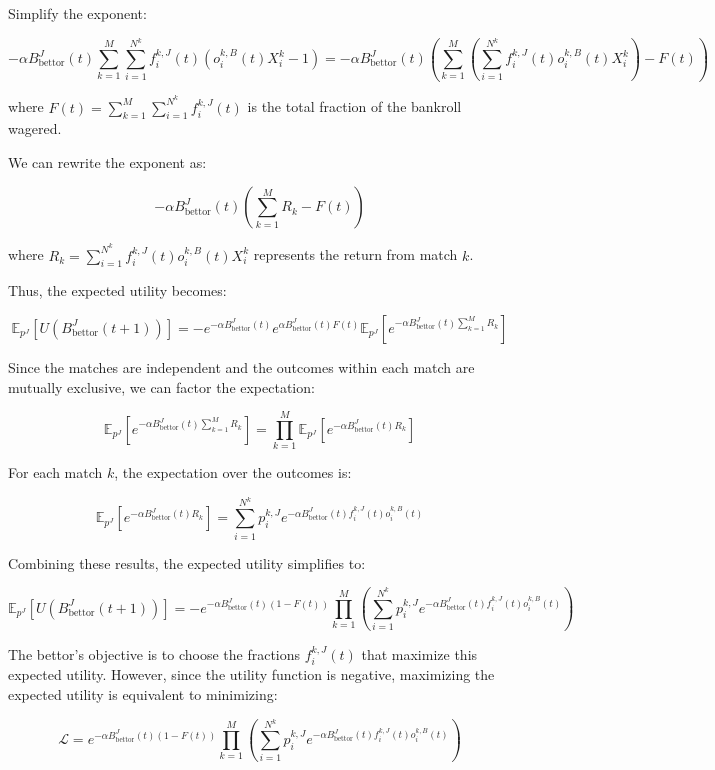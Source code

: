 Simplify the exponent:

\[
-\alpha B_{\text{bettor}}^J(t) \sum_{k=1}^M \sum_{i=1}^{N^k} f_i^{k,J}(t) \left( o_i^{k,B}(t) X_i^k - 1 \right) = -\alpha B_{\text{bettor}}^J(t) \left( \sum_{k=1}^M \left( \sum_{i=1}^{N^k} f_i^{k,J}(t) o_i^{k,B}(t) X_i^k \right) - F(t) \right)
\]

where \( F(t) = \sum_{k=1}^M \sum_{i=1}^{N^k} f_i^{k,J}(t) \) is the total fraction of the bankroll wagered.

We can rewrite the exponent as:

\[
-\alpha B_{\text{bettor}}^J(t) \left( \sum_{k=1}^M R_k - F(t) \right)
\]

where \( R_k = \sum_{i=1}^{N^k} f_i^{k,J}(t) o_i^{k,B}(t) X_i^k \) represents the return from match \( k \).

Thus, the expected utility becomes:

\[
\mathbb{E}_{p^{J}}\left[ U\left( B_{\text{bettor}}^J(t+1) \right) \right] = -e^{ -\alpha B_{\text{bettor}}^J(t) } e^{ \alpha B_{\text{bettor}}^J(t) F(t) } \mathbb{E}_{p^{J}}\left[ e^{ -\alpha B_{\text{bettor}}^J(t) \sum_{k=1}^M R_k } \right]
\]

Since the matches are independent and the outcomes within each match are mutually exclusive, we can factor the expectation:

\[
\mathbb{E}_{p^{J}}\left[ e^{ -\alpha B_{\text{bettor}}^J(t) \sum_{k=1}^M R_k } \right] = \prod_{k=1}^M \mathbb{E}_{p^{J}}\left[ e^{ -\alpha B_{\text{bettor}}^J(t) R_k } \right]
\]

For each match \( k \), the expectation over the outcomes is:

\[
\mathbb{E}_{p^{J}}\left[ e^{ -\alpha B_{\text{bettor}}^J(t) R_k } \right] = \sum_{i=1}^{N^k} p_i^{k,J} e^{ -\alpha B_{\text{bettor}}^J(t) f_i^{k,J}(t) o_i^{k,B}(t) }
\]

Combining these results, the expected utility simplifies to:

\[
\mathbb{E}_{p^{J}}\left[ U\left( B_{\text{bettor}}^J(t+1) \right) \right] = -e^{ -\alpha B_{\text{bettor}}^J(t) (1 - F(t)) } \prod_{k=1}^M \left( \sum_{i=1}^{N^k} p_i^{k,J} e^{ -\alpha B_{\text{bettor}}^J(t) f_i^{k,J}(t) o_i^{k,B}(t) } \right)
\]

The bettor's objective is to choose the fractions \( f_i^{k,J}(t) \) that maximize this expected utility. However, since the utility function is negative, maximizing the expected utility is equivalent to minimizing:

\[
\mathcal{L} = e^{ -\alpha B_{\text{bettor}}^J(t) (1 - F(t)) } \prod_{k=1}^M \left( \sum_{i=1}^{N^k} p_i^{k,J} e^{ -\alpha B_{\text{bettor}}^J(t) f_i^{k,J}(t) o_i^{k,B}(t) } \right)
\]

